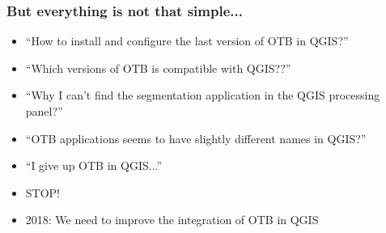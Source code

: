 \begin{frame}
\frametitle{But everything is not that simple...}
\begin{itemize}
\item ``How to install and configure the last version of OTB in QGIS?''
\item ``Which versions of OTB is compatible with QGIS??''
\item ``Why I can't find the segmentation application in the QGIS processing panel?''
\item ``OTB applications seems to have slightly different names in QGIS?''
\item ``I give up OTB in QGIS...''
\item \alert{STOP!}
\item 2018: We need to improve the integration of OTB in QGIS
\end{itemize}

\end{frame}

